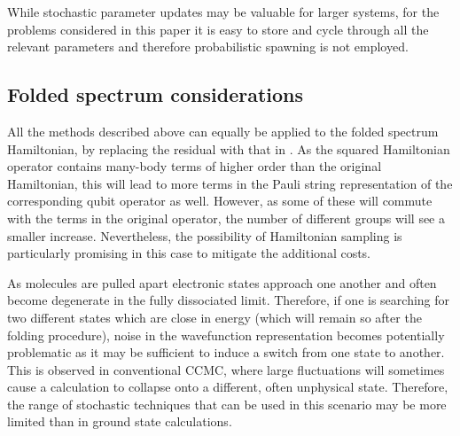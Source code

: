 \documentclass[%
 reprint,
 amsmath,amssymb,
 aps,
]{revtex4-2}
\begin{document}
While stochastic parameter updates may be valuable for larger systems, for the problems considered in this paper it is easy to store and cycle through all the relevant parameters and therefore probabilistic spawning is not employed.

\subsection{Folded spectrum considerations}
All the methods described above can equally be applied to the folded spectrum Hamiltonian, by replacing the residual with that in . As the squared Hamiltonian operator contains many-body terms of higher order than the original Hamiltonian, this will lead to more terms in the Pauli string representation of the corresponding qubit operator as well. However, as some of these will commute with the terms in the original operator, the number of different groups will see a smaller increase. 
Nevertheless, the possibility of Hamiltonian sampling is particularly promising in this case to mitigate the additional costs.

As molecules are pulled apart electronic states approach one another and often become degenerate in the fully dissociated limit. Therefore, if one is searching for two different states which are close in energy (which will remain so after the folding procedure), noise in the wavefunction representation becomes potentially problematic as it may be sufficient to induce a switch from one state to another. This is observed in conventional CCMC, where large fluctuations will sometimes cause a calculation to collapse onto a different, often unphysical state.\cite{Scott2019,Scott2020} Therefore, the range of stochastic techniques that can be used in this scenario may be more limited than in ground state calculations.
\end{document}
